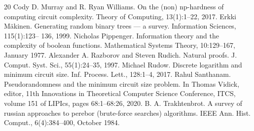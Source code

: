 \documentclass[10pt,a4paper]{article}
\begin{document}
\begin{thebibliography}{20}
Cody D. Murray and R. Ryan Williams. On the (non) np-hardness of computing circuit complexity. Theory of Computing, 13(1):1–22, 2017.
Erkki Mäkinen. Generating random binary trees — a survey. Information Sciences, 115(1):123– 136, 1999.
Nicholas Pippenger. Information theory and the complexity of boolean functions. Mathematical Systems Theory, 10:129–167, January 1977.
Alexander A. Razborov and Steven Rudich. Natural proofs. J. Comput. Syst. Sci., 55(1):24–35, 1997.
Michael Rudow. Discrete logarithm and minimum circuit size. Inf. Process. Lett., 128:1–4, 2017.
Rahul Santhanam. Pseudorandomness and the minimum circuit size problem. In Thomas Vidick, editor, 11th Innovations in Theoretical Computer Science Conference, ITCS, volume 151 of LIPIcs, pages 68:1–68:26, 2020.
B. A. Trakhtenbrot. A survey of russian approaches to perebor (brute-force searches) algorithms. IEEE Ann. Hist. Comput., 6(4):384–400, October 1984.
\end{thebibliography}
\end{document}
